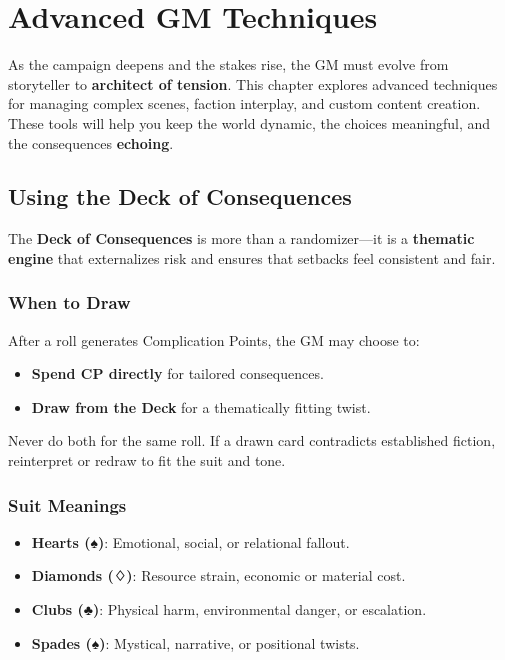 \chapter{Advanced GM Techniques}

As the campaign deepens and the stakes rise, the GM must evolve from storyteller to \textbf{architect of tension}. This chapter explores advanced techniques for managing complex scenes, faction interplay, and custom content creation. These tools will help you keep the world dynamic, the choices meaningful, and the consequences \textbf{echoing}.

\section*{Using the Deck of Consequences}

The \textbf{Deck of Consequences} is more than a randomizer—it is a \textbf{thematic engine} that externalizes risk and ensures that setbacks feel consistent and fair.

\subsection*{When to Draw}

After a roll generates Complication Points, the GM may choose to:

\begin{itemize}
    \item \textbf{Spend CP directly} for tailored consequences.
    \item \textbf{Draw from the Deck} for a thematically fitting twist.
\end{itemize}

Never do both for the same roll. If a drawn card contradicts established fiction, reinterpret or redraw to fit the suit and tone.

\subsection*{Suit Meanings}

\begin{itemize}
    \item \textbf{Hearts (♠)}: Emotional, social, or relational fallout.
    \item \textbf{Diamonds (♢)}: Resource strain, economic or material cost.
    \item \textbf{Clubs (♣)}: Physical harm, environmental danger, or escalation.
    \item \textbf{Spades (♠)}: Mystical, narrative, or positional twists.
\end{itemize}

